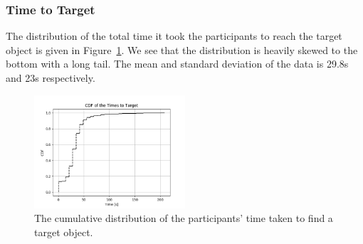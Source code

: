 \documentclass[a4paper, twoside]{article}
\begin{document}


\subsubsection{Time to Target}

\noindent The distribution of the total time it took the participants to reach the target object is given in Figure~\ref{fig:time-participants}. We see that the distribution is heavily skewed to the bottom with a long tail. The mean and standard deviation of the data is 29.8s and 23s respectively. %

\begin{figure}
  \centering
  \includegraphics[width=0.5\textwidth]{../figures/cdf_total_time.png}
  \caption{The cumulative distribution of the participants' time taken to find a target object. }\label{fig:time-participants}
\end{figure}
\end{document}
